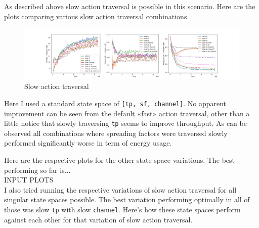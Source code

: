 As described above slow action traversal is possible in 
this scenario. Here are the plots comparing various
slow action traversal combinations.

\begin{figure}[H]
\centering
\hspace*{-3.3cm}  
\includegraphics[scale=0.40]{plots/slow_action/slow_action_hypertuning_deep_q_SMALL.png}
  \caption{Slow action traversal}
\end{figure}

Here I used a standard state space of \texttt{[tp, sf, channel]}. No apparent improvement can be seen from the default «fast»
action traversal, other than a little notice that slowly 
traversing \texttt{tp} seems to improve throughput. As can be observed all combinations where spreading factors were
traversed slowly performed significantly 
worse in term of energy usage.

Here are the respective plots for the other state space variations. The best performing so far is...\\

INPUT PLOTS\\

I also tried running the respective variations of slow action traversal for all 
singular state spaces possible. The best variation performing optimally in all of those
was slow \texttt{tp} with slow \texttt{channel}. Here's how these state spaces
perform against each other for that variation of slow action traversal. 


